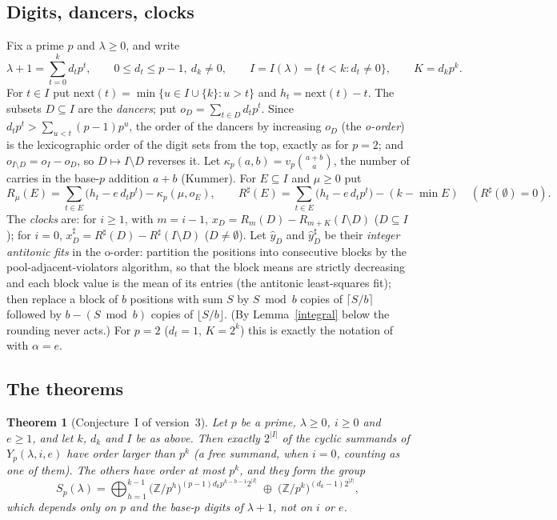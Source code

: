\documentclass[10pt]{article}
\theoremstyle{ds}
\newtheorem{theorem}{Theorem}
\theoremstyle{dsrem}
\newcommand{\Z}{\mathbb{Z}}
\begin{document}
\subsection{Digits, dancers, clocks}
Fix a prime $p$ and $\lambda\ge0$, and write
\[
\lambda+1=\sum_{t=0}^{k}d_tp^t,\qquad 0\le d_t\le p-1,\ d_k\ne0,\qquad I=I(\lambda)=\{t<k:d_t\ne0\},\qquad K=d_kp^k .
\]
For $t\in I$ put $\mathrm{next}(t)=\min\{u\in I\cup\{k\}:u>t\}$ and $h_t=\mathrm{next}(t)-t$. The subsets $D\subseteq I$ are the \emph{dancers}; put $o_D=\sum_{t\in D}d_tp^t$. Since $d_tp^t>\sum_{u<t}(p-1)p^u$, the order of the dancers by increasing $o_D$ (the \emph{o-order}) is the lexicographic order of the digit sets from the top, exactly as for $p=2$; and $o_{I\setminus D}=o_I-o_D$, so $D\mapsto I\setminus D$ reverses it. Let $\kappa_p(a,b)=v_p\binom{a+b}{a}$, the number of carries in the base-$p$ addition $a+b$ (Kummer). For $E\subseteq I$ and $\mu\ge0$ put
\[
R_\mu(E)=\sum_{t\in E}\big(h_t-e\,d_tp^t\big)-\kappa_p(\mu,o_E),\qquad R^\sharp(E)=\sum_{t\in E}\big(h_t-e\,d_tp^t\big)-(k-\min E)\quad(R^\sharp(\emptyset)=0).
\]
The \emph{clocks} are: for $i\ge1$, with $m=i-1$, $x_D=R_m(D)-R_{m+K}(I\setminus D)$ ($D\subseteq I$); for $i=0$, $x^\sharp_D=R^\sharp(D)-R^\sharp(I\setminus D)$ ($D\ne\emptyset$). Let $\hat y_D$ and $\hat y^\sharp_D$ be their \emph{integer antitonic fits} in the o-order: partition the positions into consecutive blocks by the pool-adjacent-violators algorithm, so that the block means are strictly decreasing and each block value is the mean of its entries (the antitonic least-squares fit); then replace a block of $b$ positions with sum $S$ by $S\bmod b$ copies of $\lceil S/b\rceil$ followed by $b-(S\bmod b)$ copies of $\lfloor S/b\rfloor$. (By Lemma~\ref{integral} below the rounding never acts.) For $p=2$ ($d_t=1$, $K=2^k$) this is exactly the notation of \cite[\S1.2, \S5]{DST} with $\alpha=e$.

\subsection{The theorems}
\begin{mdframed}[style=headline]
\begin{theorem}[Conjecture~I of version~3]\label{thI}
Let $p$ be a prime, $\lambda\ge0$, $i\ge0$ and $e\ge1$, and let $k$, $d_k$ and $I$ be as above. Then exactly $2^{|I|}$ of the cyclic summands of $Y_p(\lambda,i,e)$ have order larger than $p^k$ (a free summand, when $i=0$, counting as one of them). The others have order at most $p^k$, and they form the group
\[
S_p(\lambda)=\bigoplus_{h=1}^{k-1}\big(\Z/p^h\big)^{(p-1)d_kp^{k-h-1}2^{|I|}}\;\oplus\;\big(\Z/p^k\big)^{(d_k-1)2^{|I|}},
\]
which depends only on $p$ and the base-$p$ digits of $\lambda+1$, not on $i$ or $e$.
\end{theorem}
\end{mdframed}
\end{document}
